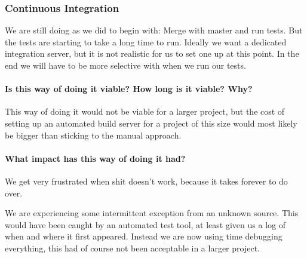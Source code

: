 \subsubsection{Continuous Integration}
We are still doing as we did to begin with: Merge with master and run tests. But the tests are starting to take a long time to run. Ideally we want a dedicated integration server, but it is not realistic for us to set one up at this point. In the end we will have to be more selective with when we run our tests.

\paragraph{Is this way of doing it viable? How long is it viable? Why?}
This way of doing it would not be viable for a larger project, but the cost of setting up an automated build server for a project of this size would most likely be bigger than sticking to the manual approach.

\paragraph{What impact has this way of doing it had?}
We get very frustrated when shit doesn't work, because it takes forever to do over. 

We are experiencing some intermittent exception from an unknown source. This would have been caught by an automated test tool, at least given us a log of when and where it first appeared. Instead we are now using time debugging everything, this had of course not been acceptable in a larger project.

